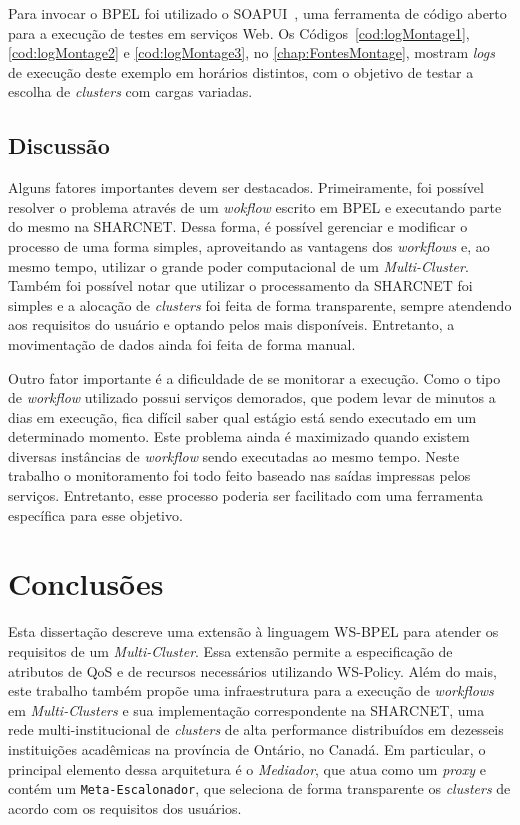 \documentclass[12pt]{report} %
\begin{document}
	Para invocar o BPEL foi utilizado o SOAPUI~\cite{soapui:website}, uma ferramenta de código aberto para a execução de testes em serviços Web. Os Códigos~\ref{cod:logMontage1}, \ref{cod:logMontage2} e \ref{cod:logMontage3}, no \autoref{chap:FontesMontage}, mostram \textit{logs} de execução deste exemplo em horários distintos, com o objetivo de testar a escolha de \textit{clusters} com cargas variadas.

    \section{Discussão}
    \label{sec:DiscussaoReal}
	Alguns fatores importantes devem ser destacados.
	Primeiramente, foi possível resolver o problema através de um \textit{wokflow} escrito em BPEL e executando parte do mesmo na SHARCNET.
	Dessa forma, é possível gerenciar e modificar o processo de uma forma simples, aproveitando as vantagens dos \textit{workflows} e, ao mesmo tempo, utilizar o grande poder computacional de um \textit{Multi-Cluster}.
	Também foi possível notar que utilizar o processamento da SHARCNET foi simples e a alocação de \textit{clusters} foi feita de forma transparente, sempre atendendo aos requisitos do usuário e optando pelos mais disponíveis.
	Entretanto, a movimentação de dados ainda foi feita de forma manual.
	
	Outro fator importante é a dificuldade de se monitorar a execução.
	Como o tipo de \textit{workflow} utilizado possui serviços demorados, que podem levar de minutos a dias em execução, fica difícil saber qual estágio está sendo executado em um determinado momento. Este problema ainda é maximizado quando existem diversas instâncias de \textit{workflow} sendo executadas ao mesmo tempo.
	Neste trabalho o monitoramento foi todo feito baseado nas saídas impressas pelos serviços.
	Entretanto, esse processo poderia ser facilitado com uma ferramenta específica para esse objetivo.
    
    
\chapter{Conclusões}
\label{chap:Conclusao}    

    Esta dissertação descreve uma extensão à linguagem WS-BPEL para atender os requisitos de um \textit{Multi-Cluster}.
    Essa extensão permite a especificação de atributos de QoS e de recursos necessários utilizando WS-Policy.
    Além do mais, este trabalho também propõe uma infraestrutura para a execução de \textit{workflows} em \textit{Multi-Clusters} e sua implementação correspondente na SHARCNET, uma rede multi-institucional de \textit{clusters} de alta performance distribuídos em dezesseis instituições acadêmicas na província de Ontário, no Canadá.
    Em particular, o principal elemento dessa arquitetura é o \textit{Mediador}, que atua como um \textit{proxy} e contém um \texttt{Meta-Escalonador}, que seleciona de forma transparente os \textit{clusters} de acordo com os requisitos dos usuários.
\end{document}
